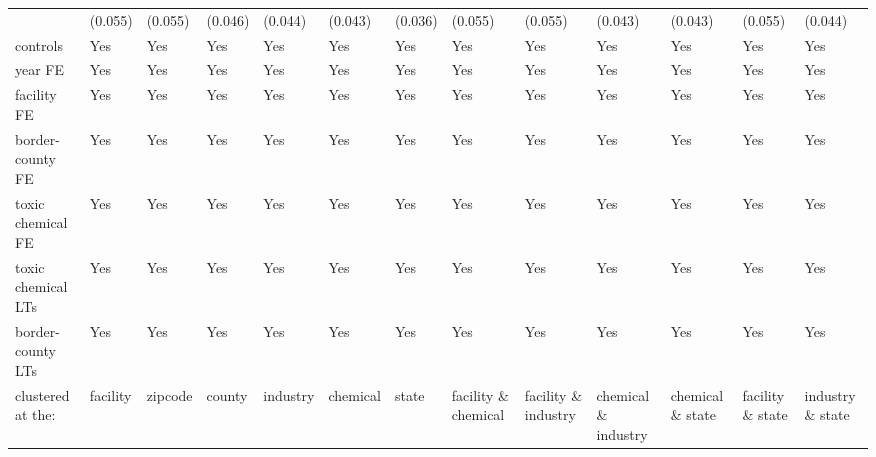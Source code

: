 \begin{table}[H]
{\begin{tabular}{@{}lllllllllllll@{}}
            & (0.055)   & (0.055)   & (0.046)   & (0.044)   & (0.043)   & (0.036)   & (0.055)              & (0.055)              & (0.043)              & (0.043)          & (0.055)          & (0.044)          \\
            controls                                      & Yes       & Yes       & Yes       & Yes       & Yes       & Yes       & Yes                  & Yes                  & Yes                  & Yes               & Yes               & Yes               \\
            year FE                                       & Yes       & Yes       & Yes       & Yes       & Yes       & Yes       & Yes                  & Yes                  & Yes                  & Yes               & Yes               & Yes               \\
            facility FE                                   & Yes       & Yes       & Yes       & Yes       & Yes       & Yes       & Yes                  & Yes                  & Yes                  & Yes               & Yes               & Yes               \\
            border-county FE                              & Yes       & Yes       & Yes       & Yes       & Yes       & Yes       & Yes                  & Yes                  & Yes                  & Yes               & Yes               & Yes               \\
            toxic chemical FE                             & Yes       & Yes       & Yes       & Yes       & Yes       & Yes       & Yes                  & Yes                  & Yes                  & Yes               & Yes               & Yes               \\
            toxic chemical LTs                            & Yes       & Yes       & Yes       & Yes       & Yes       & Yes       & Yes                  & Yes                  & Yes                  & Yes               & Yes               & Yes               \\
            border-county LTs                             & Yes       & Yes       & Yes       & Yes       & Yes       & Yes       & Yes                  & Yes                  & Yes                  & Yes               & Yes               & Yes               \\ \midrule
            clustered at the:                             & facility  & zipcode   & county    & industry  & chemical  & state     & facility \& chemical & facility \& industry & chemical \& industry & chemical \& state & facility \& state & industry \& state \\

\end{tabular}}
\end{table}
